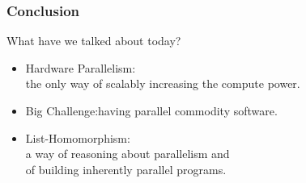 \documentclass{beamer}
\begin{document}
\begin{frame}[fragile,t]
  \frametitle{Conclusion}

What have we talked about today?\bigskip
\begin{itemize}
    \item Hardware Parallelism:\pause\\ the only way of scalably increasing the compute power.\bigskip
    \item Big Challenge:\pause having parallel commodity software.\bigskip
    \item List-Homomorphism:\\ a way of reasoning about parallelism and\\ of building inherently parallel programs.  
\end{itemize}
\end{frame}
\end{document}
